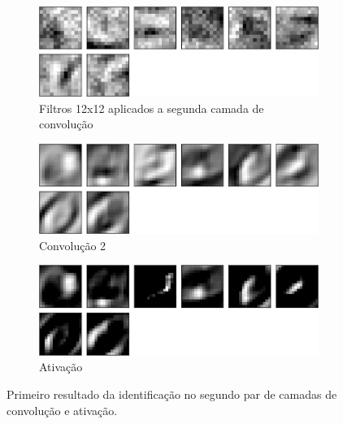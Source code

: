 \documentclass[
	12pt,				%
	oneside,			%
	a4paper,			%
	english,			%
	french,				%
	spanish,			%
	brazil,				%
	]{abntex2}
\begin{document}
\begin{center}
\begin{figure}[H]
\begin{subfigure}{.8\textwidth}
	\centering
	\includegraphics[width=.6\linewidth]{images/fabio/resultados/network_3/filter_convolution2d_2}%
	\caption{Filtros 12x12 aplicados a segunda camada de convolução}		
	\label{fig:filtros12x12}	
\end{subfigure}%

\begin{subfigure}{.8\textwidth}
	\centering
	\includegraphics[width=.6\linewidth]{images/fabio/resultados/network_3/input_1_layer_convolution2d_2}
	\caption{Convolução 2}
\end{subfigure}%

\begin{subfigure}{.8\textwidth}
	\centering
	\includegraphics[width=.6\linewidth]{images/fabio/resultados/network_3/input_1_layer_activation_2}%
	\caption{Ativação}			
\end{subfigure}%
\caption{Primeiro resultado da identificação no segundo par de camadas de convolução e ativação.}
\label{fig:camada_2}
\end{figure}
\end{center}
\end{document}
